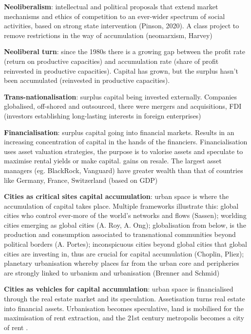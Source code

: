\documentclass{article}
\newcommand{\alignedmarginpar}[1]{%
        \marginpar{\raggedright\small #1}
    }
\begin{document}
\textbf{Neoliberalism}: intellectual and political proposals that extend market mechanisms and ethics of competition to an ever-wider spectrum of social activities, based on strong state intervention (Pinson, 2020). A class project to remove restrictions in the way of accumulation (neomarxism, Harvey)

\textbf{Neoliberal turn}: since the 1980s there is a growing gap between the profit rate (return on productive capacities) and accumulation rate (share of profit reinvested in productive capacities). Capital has grown, but the surplus hasn't been accumulated (reinvested in productive capacities).

\textbf{Trans-nationalisation}: surplus capital being invested externally. Companies globalised, off-shored and outsourced, there were mergers and acquisitions, FDI (investors establishing long-lasting interests in foreign enterprises)

\textbf{Financialisation}: surplus capital going into financial markets. Results in an increasing concentration of capital in the hands of the financiers. Financialisation uses asset valuation strategies, the purpose is to valorise assets and speculate to maximise rental yields or make capital. gains on resale. The largest asset managers (eg. BlackRock, Vanguard) have greater wealth than that of countries like Germany, France, Switzerland (based on GDP)

\textbf{Cities as critical sites capital accumulation}: urban space is where the accumulation of capital takes place. Multiple frameworks illustrate this: global cities who control ever-more of the world's networks and flows (Sassen); worlding cities emerging as global cities (A. Roy, A. Ong); globalisation from below, is the production and consumption associated to transnational communities beyond political borders (A. Portes); inconspicuous cities beyond global cities that global cities are investing in, thus are crucial for capital accumulation (Choplin, Pliez); planetary urbanisation whereby places far from the urban core and peripheries are strongly linked to urbanism and urbanisation (Brenner and Schmid)

\textbf{Cities as vehicles for capital accumulation}:\alignedmarginpar{Battersea Power Station} urban space is financialised through the real estate market and its speculation. Assetisation turns real estate into financial assets. Urbanisation becomes speculative, land is mobilised for the maximisation of rent extraction, and the 21st century metropolis becomes a city of rent\alignedmarginpar{Charnock et. al}.
\end{document}
